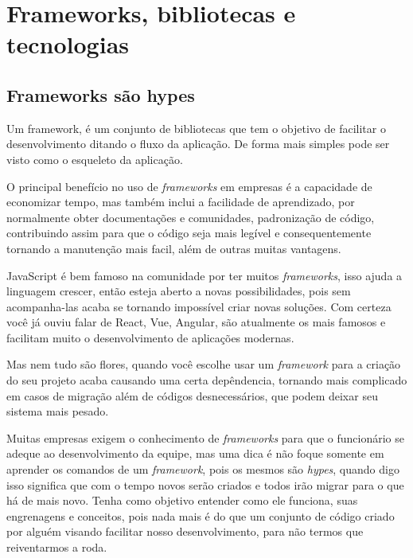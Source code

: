 \documentclass[
	12pt,				%
	openright,			%
	twoside,			%
	a4paper,			%
	english,			%
	brazil				%
	]{abntex2}
\begin{document}


\part{Frameworks, bibliotecas e tecnologias}
\chapter{Frameworks são hypes}

Um framework, é um conjunto de bibliotecas que tem o objetivo de facilitar o desenvolvimento ditando o fluxo da aplicação. De forma mais simples pode ser visto como o esqueleto da aplicação.

O principal benefício no uso de \textit{frameworks} em empresas é a capacidade de economizar tempo, mas também inclui a facilidade de aprendizado, por normalmente obter documentações e comunidades, padronização de código, contribuindo assim para que o código seja mais legível e consequentemente tornando a manutenção mais facil, além de outras muitas vantagens.

JavaScript é bem famoso na comunidade por ter muitos \textit{frameworks}, isso ajuda a linguagem crescer, então esteja aberto a novas possibilidades, pois sem acompanha-las acaba se tornando impossível criar novas soluções. Com certeza você já ouviu falar de React, Vue, Angular, são atualmente os mais famosos e facilitam muito o desenvolvimento de aplicações modernas.

Mas nem tudo são flores, quando você escolhe usar um \textit{framework} para a criação do seu projeto acaba causando uma certa depêndencia, tornando mais complicado em casos de migração além de códigos desnecessários, que podem deixar seu sistema mais pesado.

Muitas empresas exigem o conhecimento de \textit{frameworks} para que o funcionário se adeque ao desenvolvimento da equipe, mas uma dica é não foque somente em aprender os comandos de um \textit{framework}, pois os mesmos são \textit{hypes}, quando digo isso significa que com o tempo novos serão criados e todos irão migrar para o que há de mais novo. Tenha como objetivo entender como ele funciona, suas engrenagens e conceitos, pois nada mais é do que um conjunto de código criado por alguém visando facilitar nosso desenvolvimento, para não termos que reiventarmos a roda.
\end{document}

